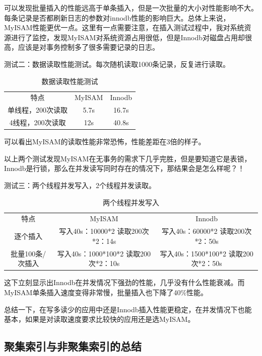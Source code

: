 \documentclass[UTF8]{ctexart}
\begin{document}
可以发现批量插入的性能远高于单条插入，但是一次批量的大小对性能影响不大。每条记录是否都刷新日志的参数对innodb性能的影响巨大。总体上来说，MyISAM性能更优一点。这里有一点需要注意，在插入测试过程中，我对系统资源进行了监控，发现MyISAM对系统资源占用很低，但是Innodb对磁盘占用却很高，应该是对事务控制多了很多需要记录的日志。

测试二：数据读取性能测试。每次随机读取1000条记录，反复进行读取。
\begin{table}[]
\caption{数据读取性能测试}
\vspace{20pt}
\centering
\begin{tabular}{c|c|c|}
\hline
特点     &   MyISAM     &   Innodb\\
单线程，200次读取      &   5.7s  &16.7s\\
4线程，200次读取       &   12s& 40.8s\\
\hline       
\end{tabular}
\label{bs5}
\end{table}
可以看出MyISAM的读取性能非常恐怖，性能差距在3倍的样子。

以上两个测试发现MyISAM在无事务的需求下几乎完胜，但是要知道它是表锁，Innodb是行锁，那么在并发读写同时存在的情况下，那结果会是怎么样呢？！

测试三：两个线程并发写入，2个线程并发读取。
\begin{table}[]
\caption{两个线程并发写入}
\vspace{20pt}
\centering
\begin{tabular}{c|c|c|}
\hline
特点    &  MyISAM                      &           Innodb\\
逐个插入              &  写入40s：10000*2 读取200次*2：14s     &   写入40s：60000*2 读取200次*2：50s\\
批量100条/次插入      &  写入40s：1000*100*2 读取200次*2：10s   &   写入40s：1500*100*2 读取200次*2：50s\\
\hline       
\end{tabular}
\label{bs5}
\end{table}

这下立刻显示出Innodb在并发情况下强劲的性能，几乎没有什么性能衰减。而MyISAM单条插入速度变得非常慢，批量插入也下降了40\%性能。

总结一下，在写多读少的应用中还是Innodb插入性能更稳定，在并发情况下也能基本，如果是对读取速度要求比较快的应用还是选MyISAM。
\subsection{聚集索引与非聚集索引的总结}
\end{document}

